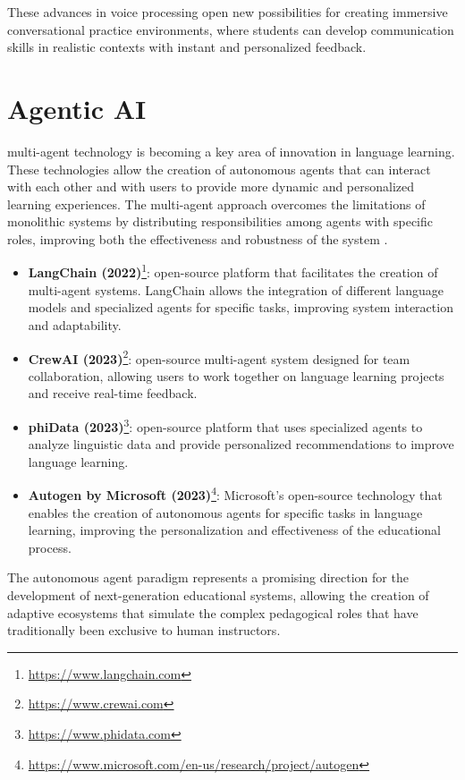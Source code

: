 These advances in voice processing open new possibilities for creating immersive conversational practice environments, where students can develop communication skills in realistic contexts with instant and personalized feedback.

\section{Agentic AI}
\label{sec:agentic-ai}

\gls{multi-agent} technology is becoming a key area of innovation in language learning. These technologies allow the creation of autonomous agents that can interact with each other and with users to provide more dynamic and personalized learning experiences. The multi-agent approach overcomes the limitations of monolithic systems by distributing responsibilities among agents with specific roles, improving both the effectiveness and robustness of the system \cite{Liu2023}.

\begin{itemize}
  \item \textbf{LangChain (2022)}\footnote{\url{https://www.langchain.com}}: \gls{open-source} platform that facilitates the creation of \gls{multi-agent} systems. LangChain allows the integration of different language models and specialized agents for specific tasks, improving system interaction and adaptability.
  \item \textbf{CrewAI (2023)}\footnote{\url{https://www.crewai.com}}: \gls{open-source} multi-agent system designed for team collaboration, allowing users to work together on language learning projects and receive real-time feedback.
  \item \textbf{phiData (2023)}\footnote{\url{https://www.phidata.com}}: \gls{open-source} platform that uses specialized agents to analyze linguistic data and provide personalized recommendations to improve language learning.
  \item \textbf{Autogen by Microsoft (2023)}\footnote{\url{https://www.microsoft.com/en-us/research/project/autogen}}: Microsoft's \gls{open-source} technology that enables the creation of autonomous agents for specific tasks in language learning, improving the personalization and effectiveness of the educational process.
\end{itemize}

The autonomous agent paradigm represents a promising direction for the development of next-generation educational systems, allowing the creation of adaptive ecosystems that simulate the complex pedagogical roles that have traditionally been exclusive to human instructors.

